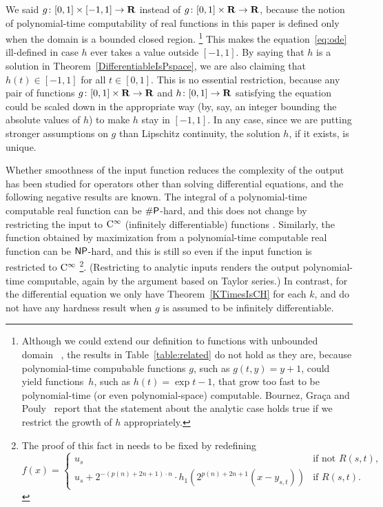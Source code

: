We said
$g \colon [0,1] \times [-1, 1] \to \mathbf R$ instead of 
$g \colon [0,1] \times \mathbf R \to \mathbf R$, because
the notion of polynomial-time computability of real functions 
in this paper is defined only when the domain is a bounded closed region.%
\footnote{%
Although we could extend our definition to 
functions with unbounded domain~%
\cite[Sect.~4.1]{kawamura2010operators}, 
the results in Table~\ref{table:related} 
do not hold as they are, 
because polynomial-time compubable functions $g$, 
such as $g (t, y) = y + 1$, 
could yield functions~$h$, such as $h (t) = \exp t - 1$, 
that grow too fast to be polynomial-time (or even polynomial-space) computable. 
Bournez, Gra\c ca and Pouly~%
\cite[Theorem~2]{bournez11:_solvin_analy_differ_equat_in}
report that the statement about the analytic case holds true 
if we restrict the growth of $h$ %
appropriately. 
} 
This makes the equation~\eqref{eq:ode} ill-defined 
in case $h$ ever takes a value outside $[-1, 1]$. 
By saying that $h$ is a solution in Theorem~\ref{DifferentiableIsPspace}, 
we are also claiming that 
$h (t) \in [-1, 1]$ for all $t \in [0, 1]$. 
This is no essential restriction, 
because any pair of functions 
$g \colon [0,1] \times \mathbf R \to \mathbf R$ and $h \colon [0, 1] \to \mathbf R$
satisfying the equation
could be scaled down in the appropriate way 
(by, say, an integer bounding the absolute values of $h$)
to make $h$ stay in $[-1, 1]$. 
In any case, 
since we are putting stronger assumptions on $g$ than Lipschitz continuity, 
the solution $h$, if it exists, is unique. 

Whether smoothness of the input function 
reduces the complexity of the output
has been studied for operators other than solving differential equations, 
and the following negative results are known. 
The integral of a polynomial-time computable real function 
can be $\mathsf{\#P}$-hard, and this does not change 
by restricting the input to 
$\mathrm C ^\infty$ (infinitely differentiable) functions
\cite[Theorem~5.33]{ko1991complexity}. 
Similarly, the function obtained by maximization 
from a polynomial-time computable real function 
can be $\mathsf{NP}$-hard, and this is still so
even if the input function is restricted to $\mathrm C ^\infty$ 
\cite[Theorem~3.7]{ko1991complexity}%
\footnote{%
The proof of this fact in \cite[Theorem 3.7]{ko1991complexity}
needs to be fixed by redefining 
\[f(x) = 
\begin{cases}
 u_s & \text{if not } R(s,t), \\
 u_s + 2^{-(p(n)+2n+1)\cdot n} \cdot h_1(2^{p(n)+2n+1} (x - y_{s,t})) & \text{if } R(s,t). 
\end{cases}\]
}. 
(Restricting to analytic inputs 
renders the output polynomial-time computable, 
again by the argument based on Taylor series.)
In contrast, for the differential equation
we only have Theorem~\ref{KTimesIsCH} for each $k$, 
and do not have any hardness result 
when $g$ is assumed to be infinitely differentiable. 

